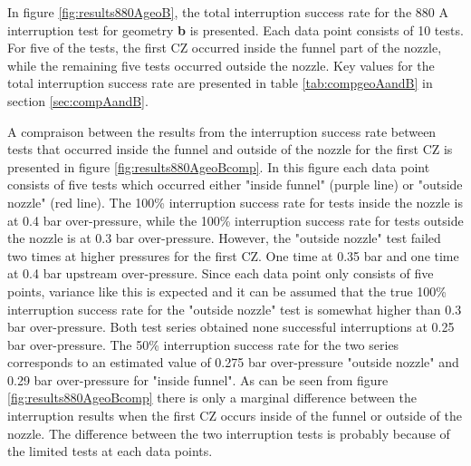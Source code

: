 \documentclass[10pt,b5paper,twoside]{article}
\begin{document}
In figure \ref{fig:results880AgeoB}, the total interruption success rate for the 880 A interruption test for geometry \textbf{b} is presented. Each data point consists of 10 tests. For five of the tests, the first CZ occurred inside the funnel part of the nozzle, while the remaining five tests occurred outside the nozzle. Key values for the total interruption success rate are presented in table \ref{tab:compgeoAandB} in section \ref{sec:compAandB}. 


A compraison between the results from the interruption success rate between tests that occurred inside the funnel and outside of the nozzle for the first CZ is presented in figure \ref{fig:results880AgeoBcomp}. In this figure each data point consists of five tests which occurred either "inside funnel" (purple line) or "outside nozzle" (red line). The 100\% interruption success rate for tests inside the nozzle is at 0.4 bar over-pressure, while the 100\% interruption success rate for tests outside the nozzle is at 0.3 bar over-pressure. However, the "outside nozzle" test failed two times at higher pressures for the first CZ. One time at 0.35 bar and one time at 0.4 bar upstream over-pressure. Since each data point only consists of five points, variance like this is expected and it can be assumed that the true 100\% interruption success rate for the "outside nozzle" test is somewhat higher than 0.3 bar over-pressure. Both test series obtained none successful interruptions at 0.25 bar over-pressure. The 50\% interruption success rate for the two series corresponds to an estimated value of 0.275 bar over-pressure "outside nozzle" and 0.29 bar over-pressure for "inside funnel". As can be seen from figure \ref{fig:results880AgeoBcomp} there is only a marginal difference between the interruption results when the first CZ occurs inside of the funnel or outside of the nozzle. The difference between the two interruption tests is probably because of the limited tests at each data points.
\end{document}
